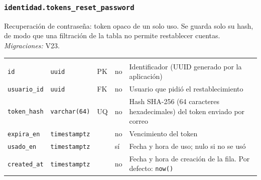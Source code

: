 \subsubsection{\texorpdfstring{\texttt{identidad.tokens\_\allowbreak{}reset\_\allowbreak{}password}}{identidad.tokens\_reset\_password}}\label{dd:identidad.tokens_reset_password}

Recuperación de contraseña: token opaco de un solo uso. Se guarda solo su hash, de modo que una filtración de la tabla no permite restablecer cuentas. \emph{Migraciones:} V23.

{\small
\begin{xltabular}{\textwidth}{@{}>{\raggedright\arraybackslash}p{3.6cm} >{\raggedright\arraybackslash}p{2.3cm} >{\raggedright\arraybackslash}p{1cm} >{\centering\arraybackslash}p{0.85cm} L@{}}
    \toprule
     &  &  &  &  \\
    \midrule
    \endfirsthead
    \toprule
     &  &  &  &  \\
    \midrule
    \endhead
    \bottomrule
    \endfoot
    \texttt{id} & \texttt{uuid} & PK & no & Identificador (UUID generado por la aplicación) \\
    \texttt{usuario\_\allowbreak{}id} & \texttt{uuid} & FK & no & Usuario que pidió el restablecimiento \\
    \texttt{token\_\allowbreak{}hash} & \texttt{varchar(\allowbreak{}64)} & UQ & no & Hash SHA-256 (64 caracteres hexadecimales) del token enviado por correo \\
    \texttt{expira\_\allowbreak{}en} & \texttt{timestamptz} &  & no & Vencimiento del token \\
    \texttt{usado\_\allowbreak{}en} & \texttt{timestamptz} &  & sí & Fecha y hora de uso; nulo si no se usó \\
    \texttt{created\_\allowbreak{}at} & \texttt{timestamptz} &  & no & Fecha y hora de creación de la fila. Por defecto: \texttt{now(\allowbreak{})} \\
\end{xltabular}
}

